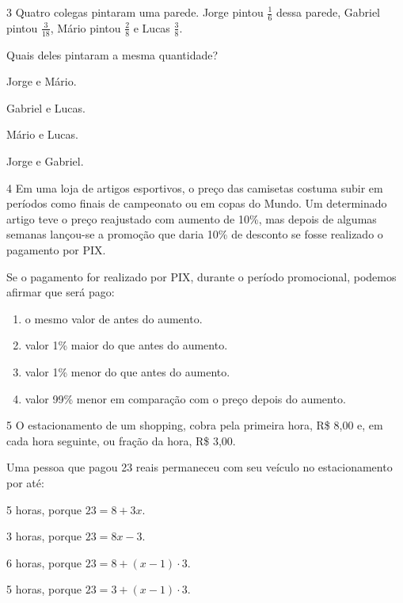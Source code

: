 \num{3} Quatro colegas pintaram uma parede. Jorge pintou $\frac{1}{6}$ dessa parede, Gabriel pintou $\frac{3}{18}$, Mário pintou $\frac{2}{8}$ e Lucas $\frac{3}{8}$.

\pagebreak
Quais deles pintaram a mesma quantidade?

\begin{escolha}

  \item Jorge e Mário.

  \item Gabriel e Lucas.

  \item Mário e Lucas.

  \item Jorge e Gabriel.

\end{escolha}

\num{4} Em uma loja de artigos esportivos, o preço das camisetas costuma 
subir em períodos como finais de campeonato ou em copas do Mundo. Um determinado
artigo teve o preço reajustado com aumento de 10\%, mas depois de algumas semanas
lançou-se a promoção que daria 10\% de desconto se fosse realizado o
pagamento por PIX.

Se o pagamento for realizado por PIX, durante o período promocional,
podemos afirmar que será pago:

\begin{enumerate}

\item o mesmo valor de antes do aumento.

\item valor 1\% maior do que antes do aumento.

\item valor 1\% menor do que antes do aumento.

\item valor 99\% menor em comparação com o preço depois do aumento.

\end{enumerate}


\num{5} O estacionamento de um shopping, cobra pela primeira hora, R\$ 8,00 e, em cada hora seguinte,
ou fração da hora, R\$ 3,00.

Uma pessoa que pagou 23 reais permaneceu com seu veículo no estacionamento por até:

\begin{escolha}
  
  \item 5 horas, porque $23 = 8 + 3x$.

  \item 3 horas, porque $23 = 8x - 3$.

  \item 6 horas, porque $23 = 8 + (x - 1) \cdot 3$.

  \item 5 horas, porque $23 = 3 + (x - 1) \cdot 3$.

\end{escolha}


